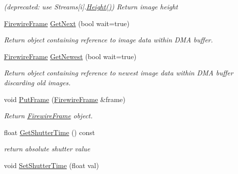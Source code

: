 \begin{DoxyCompactItemize}
\begin{DoxyCompactList}\small\item\em (deprecated\+: use Streams\mbox{[}i\mbox{]}.\hyperlink{classpangolin_1_1_firewire_video_a2c7695e31533bda8c63931946e64c7b0}{Height()}) Return image height \end{DoxyCompactList}\item 
\hyperlink{classpangolin_1_1_firewire_frame}{Firewire\+Frame} \hyperlink{classpangolin_1_1_firewire_video_a7166bc530dfac2362956761f34e73436}{Get\+Next} (bool wait=true)
\begin{DoxyCompactList}\small\item\em Return object containing reference to image data within D\+MA buffer. \end{DoxyCompactList}\item 
\hyperlink{classpangolin_1_1_firewire_frame}{Firewire\+Frame} \hyperlink{classpangolin_1_1_firewire_video_adad292fb68e0f81c97817b249a4ba032}{Get\+Newest} (bool wait=true)
\begin{DoxyCompactList}\small\item\em Return object containing reference to newest image data within D\+MA buffer discarding old images. \end{DoxyCompactList}\item 
void \hyperlink{classpangolin_1_1_firewire_video_a67697c233b215e2653b291fa91819a2c}{Put\+Frame} (\hyperlink{classpangolin_1_1_firewire_frame}{Firewire\+Frame} \&frame)
\begin{DoxyCompactList}\small\item\em Return \hyperlink{classpangolin_1_1_firewire_frame}{Firewire\+Frame} object. \end{DoxyCompactList}\item 
float \hyperlink{classpangolin_1_1_firewire_video_a407d7d270893d7d2e137867f0bf4859c}{Get\+Shutter\+Time} () const \hypertarget{classpangolin_1_1_firewire_video_a407d7d270893d7d2e137867f0bf4859c}{}\label{classpangolin_1_1_firewire_video_a407d7d270893d7d2e137867f0bf4859c}

\begin{DoxyCompactList}\small\item\em return absolute shutter value \end{DoxyCompactList}\item 
void \hyperlink{classpangolin_1_1_firewire_video_a9eb2207c6ff877e7f7c466795fad1370}{Set\+Shutter\+Time} (float val)\hypertarget{classpangolin_1_1_firewire_video_a9eb2207c6ff877e7f7c466795fad1370}{}\label{classpangolin_1_1_firewire_video_a9eb2207c6ff877e7f7c466795fad1370}


\end{DoxyCompactItemize}
